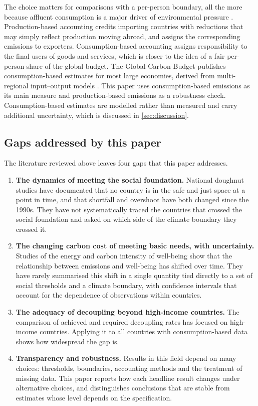 The choice matters for comparisons with a per-person boundary, all the more because affluent consumption is a major driver of environmental pressure \citep{wiedmann2020}. Production-based accounting credits importing countries with reductions that may simply reflect production moving abroad, and assigns the corresponding emissions to exporters. Consumption-based accounting assigns responsibility to the final users of goods and services, which is closer to the idea of a fair per-person share of the global budget. The Global Carbon Budget publishes consumption-based estimates for most large economies, derived from multi-regional input--output models \citep{friedlingstein2026}. This paper uses consumption-based emissions as its main measure and production-based emissions as a robustness check. Consumption-based estimates are modelled rather than measured and carry additional uncertainty, which is discussed in \cref{sec:discussion}.

\subsection{Gaps addressed by this paper}

The literature reviewed above leaves four gaps that this paper addresses.

\begin{enumerate}
\item \textbf{The dynamics of meeting the social foundation.} National doughnut studies have documented that no country is in the safe and just space at a point in time, and that shortfall and overshoot have both changed since the 1990s. They have not systematically traced the countries that crossed the social foundation and asked on which side of the climate boundary they crossed it.

\item \textbf{The changing carbon cost of meeting basic needs, with uncertainty.} Studies of the energy and carbon intensity of well-being show that the relationship between emissions and well-being has shifted over time. They have rarely summarised this shift in a single quantity tied directly to a set of social thresholds and a climate boundary, with confidence intervals that account for the dependence of observations within countries.

\item \textbf{The adequacy of decoupling beyond high-income countries.} The comparison of achieved and required decoupling rates has focused on high-income countries. Applying it to all countries with consumption-based data shows how widespread the gap is.

\item \textbf{Transparency and robustness.} Results in this field depend on many choices: thresholds, boundaries, accounting methods and the treatment of missing data. This paper reports how each headline result changes under alternative choices, and distinguishes conclusions that are stable from estimates whose level depends on the specification.
\end{enumerate}
